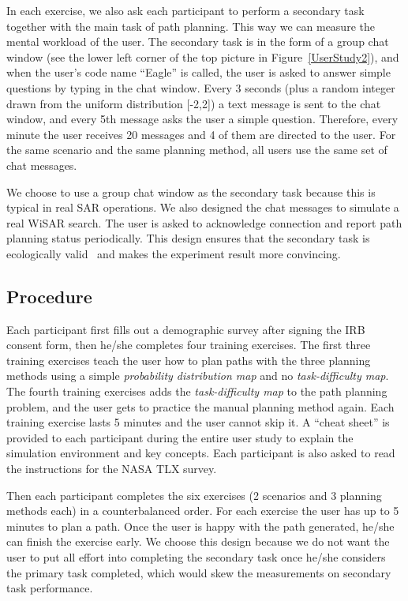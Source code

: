 In each exercise, we also ask each participant to perform a secondary task together with the main task of path planning. This way we can measure the mental workload of the user. The secondary task is in the form of a group chat window (see the lower left corner of the top picture in Figure~\ref{UserStudy2}), and when the user's code name ``Eagle'' is called, the user is asked to answer simple questions by typing in the chat window. Every 3 seconds (plus a random integer drawn from the uniform distribution [-2,2]) a text message is sent to the chat window, and every 5th message asks the user a simple question. Therefore, every minute the user receives 20 messages and 4 of them are directed to the user. For the same scenario and the same planning method, all users use the same set of chat messages.

We choose to use a group chat window as the secondary task because this is typical in real SAR operations. We also designed the chat messages to simulate a real WiSAR search. The user is asked to acknowledge connection and report path planning status periodically. This design ensures that the secondary task is ecologically valid~\cite{Vicente1997Should,Rasmussen1994Cognitive} and makes the experiment result more convincing.

\subsection{Procedure}

Each participant first fills out a demographic survey after signing the IRB consent form, then he/she completes four training exercises. The first three training exercises teach the user how to plan paths with the three planning methods using a simple \textit{probability distribution map} and no \textit{task-difficulty map}. The fourth training exercises adds the \textit{task-difficulty map} to the path planning problem, and the user gets to practice the manual planning method again. Each training exercise lasts 5 minutes and the user cannot skip it. A ``cheat sheet'' is provided to each participant during the entire user study to explain the simulation environment and key concepts. Each participant is also asked to read the instructions for the NASA TLX survey.

Then each participant completes the six exercises (2 scenarios and 3 planning methods each) in a counterbalanced order. For each exercise the user has up to 5 minutes to plan a path. Once the user is happy with the path generated, he/she can finish the exercise early. We choose this design because we do not want the user to put all effort into completing the secondary task once he/she considers the primary task completed, which would skew the measurements on secondary task performance.

